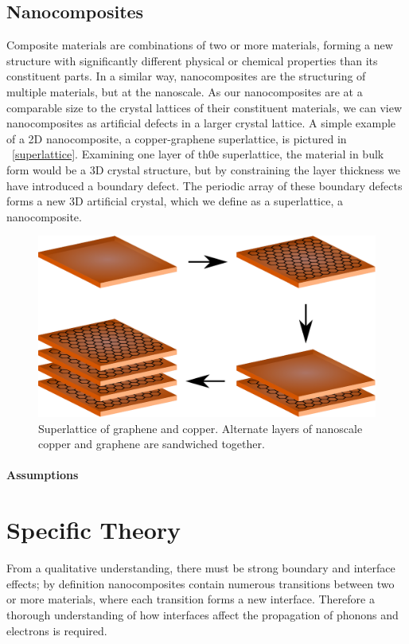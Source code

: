 \documentclass[12pt,draft]{article}
\newcommand{\figref}[2][\figurename~]{#1\ref{#2}}
\begin{document}
\subsection{Nanocomposites}
Composite materials are combinations of two or more materials, forming a new structure with significantly different physical or chemical properties than its constituent parts. In a similar way, nanocomposites are the structuring of multiple materials, but at the nanoscale. As our nanocomposites are at a comparable size to the crystal lattices of their constituent materials, we can view nanocomposites as artificial defects in a larger crystal lattice. A simple example of a 2D nanocomposite, a copper-graphene superlattice, is pictured in \figref{superlattice}. Examining one layer of th0e superlattice, the material in bulk form would be a 3D crystal structure, but by constraining the layer thickness we have introduced a boundary defect. The periodic array of these boundary defects forms a new 3D artificial crystal, which we define as a superlattice, a nanocomposite.

\begin{figure}
	\centering
	\includegraphics[width=\textwidth]{graphene-superlattice.eps}
	\caption{Superlattice of graphene and copper. Alternate layers of nanoscale copper and graphene are sandwiched together.}
	\label{fig:superlattice}
\end{figure}

\paragraph{Assumptions}

\section{Specific Theory}
From a qualitative understanding, there must be strong boundary and interface effects; by definition nanocomposites contain numerous transitions between two or more materials, where each transition forms a new interface. Therefore a thorough understanding of how interfaces affect the propagation of phonons and electrons is required.
\end{document}
